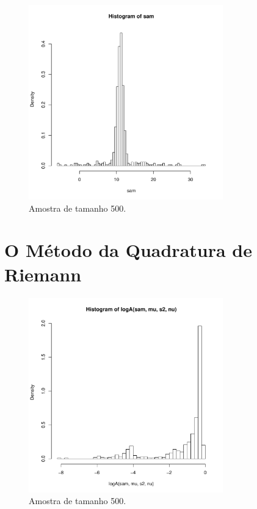 \documentclass[12pt,reqno,a4paper,oneside]{report}
\begin{document}
\begin{figure}[!htb]
	\centering
	\includegraphics[width=0.75\textwidth]{figuras/parte1/amostra_n.pdf}
	\caption{Amostra de tamanho 500.}
	\label{fig:sample}
\end{figure}



\section*{\Large O Método da Quadratura de Riemann}

\begin{figure}[!htb]
	\centering
	\includegraphics[width=0.75\textwidth]{figuras/parte1/logA.pdf}
	\caption{Amostra de tamanho 500.}
	\label{fig:logA}
\end{figure}
\end{document}
